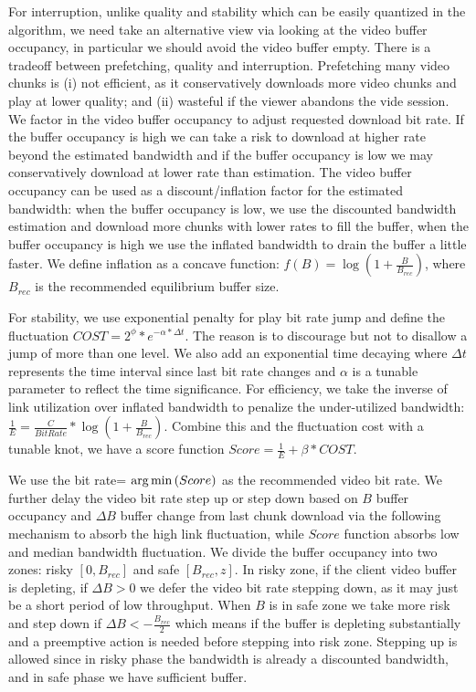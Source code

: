 
For interruption, unlike quality and stability which can be easily quantized in the algorithm, we need take an alternative view via looking at the video buffer occupancy, in particular we should avoid the video buffer empty. There is a tradeoff between prefetching, quality and interruption. Prefetching many video chunks is (i) not efficient, as it conservatively downloads more video chunks and play at lower quality; and (ii) wasteful if the viewer abandons the vide session. We factor in the video buffer occupancy to adjust requested download bit rate. If the buffer occupancy is high we can take a risk to download at higher rate beyond the estimated bandwidth and if the buffer occupancy is low we may conservatively download at lower rate than estimation. The video buffer occupancy can be used as a discount/inflation factor for the estimated bandwidth: when the buffer occupancy is low, we use the discounted bandwidth estimation and download more chunks with lower rates to fill the buffer, when the buffer occupancy is high we use the inflated bandwidth to drain the buffer a little faster. We define inflation as a concave function: $f(B)= \log(1+\frac{B}{B_{rec}})$, where $B_{rec}$ is the recommended equilibrium buffer size.  

For stability, we use exponential penalty for play bit rate jump and define the fluctuation $COST = 2^{\phi} *e^{-\alpha *\Delta t}$. The reason is to discourage but not to disallow a jump of more than one level. We also add an exponential time decaying where $\Delta t$ represents the time interval since last bit rate changes and $\alpha$ is a tunable parameter to reflect the time significance. For efficiency, we take the inverse of link utilization over inflated bandwidth to penalize the under-utilized bandwidth: $\frac{1}{E} = \frac{C}{BitRate}*\log(1+\frac{B}{B_{rec}}) $. Combine this and the fluctuation cost with a tunable knot, we have a score function $Score= \frac{1}{E} + \beta*COST$. 


We use the bit rate= $\operatorname*{arg\,min}{(Score)}$ as the recommended video bit rate. We further delay the video bit rate step up or step down based on $B$ buffer occupancy and $\Delta B$ buffer change from last chunk download via the following mechanism to absorb the high link fluctuation, while $Score$ function absorbs low and median bandwidth fluctuation. We divide the buffer occupancy into two zones: risky $[0,B_{rec}]$ and safe $[B_{rec},z]$. In risky zone, if the client video buffer is depleting, if $\Delta B>0$ we defer the video bit rate stepping down, as it may just be a short period of low throughput. When $B$ is in safe zone we take more risk and step down if $\Delta B <-\frac{B_{rec}}{2}$ which means if the buffer is depleting substantially and a preemptive action is needed before stepping into risk zone. Stepping up is allowed since in risky phase the bandwidth is already a discounted bandwidth, and in safe phase we have sufficient buffer. 
  
